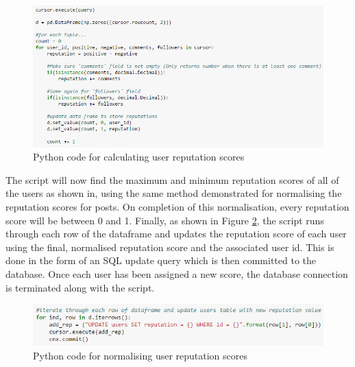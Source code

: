 \begin{figure}[H]
\centering
\includegraphics[width=6in]{Images/Implementation/UserRepPython1}
\caption{Python code for calculating user reputation scores}
\label{fig:UserRepPython1}
\end{figure}

The script will now find the maximum and minimum reputation scores of all of the users as shown in, using the same method demonstrated for normalising the reputation scores for posts. On completion of this normalisation, every reputation score will be between 0 and 1. Finally, as shown in Figure \ref{fig:UserRepPython2}, the script runs through each row of the dataframe and updates the reputation score of each user using the final, normalised reputation score and the associated user id. This is done in the form of an SQL update query which is then committed to the database. Once each user has been assigned a new score, the database connection is terminated along with the script.

\begin{figure}[H]
\centering
\includegraphics[width=6in]{Images/Implementation/UserRepPython2}
\caption{Python code for normalising user reputation scores}
\label{fig:UserRepPython2}
\end{figure}